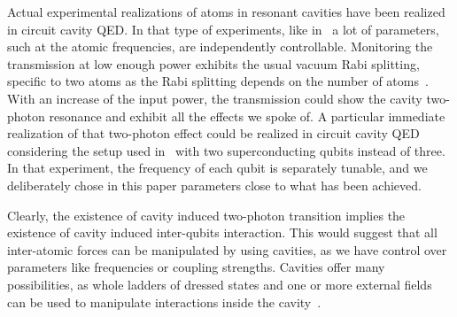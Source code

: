 Actual experimental realizations of atoms in resonant cavities have been realized in circuit cavity QED. In that type of experiments, like in~\cite{Fin08, Fin09,Bau09} a lot of parameters, such at the atomic frequencies, are independently controllable. Monitoring the transmission at low enough power exhibits the usual vacuum Rabi splitting, specific to two atoms as the Rabi splitting depends on the number of atoms~\cite{San83, Aga84, Rai89, Boc04, Mau05, tho98}. With an increase of the input power, the transmission could show the cavity two-photon resonance and exhibit all the effects we spoke of. A particular immediate realization of that two-photon effect could be realized in circuit cavity QED considering the setup used in~\cite{Fin09} with two superconducting qubits instead of three. In that experiment, the frequency of each qubit is separately tunable, and we deliberately chose in this paper parameters close to what has been achieved.

Clearly, the existence of cavity induced two-photon transition implies the existence of cavity induced inter-qubits interaction. This would suggest that all inter-atomic forces can be manipulated by using cavities, as we have control over parameters like frequencies or coupling strengths. Cavities offer many possibilities, as whole ladders of dressed states and one or more external fields can be used to manipulate interactions inside the cavity~\cite{sol03, Bir05}.

